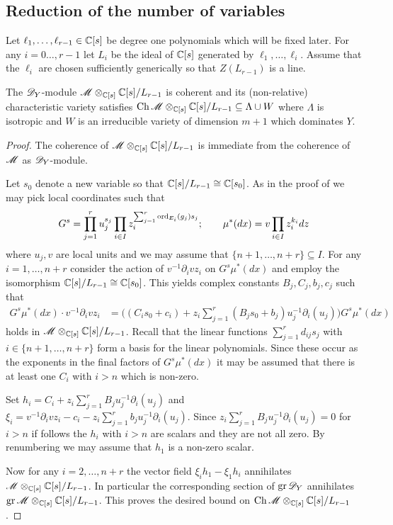   \subsection{Reduction of the number of variables}
  Let $\ell_1,\ldots,\ell_{r-1}\in \mathbb{C}[s]$ be degree one polynomials which will be fixed later.
  For any $i=0\ldots,r-1$ let $L_i$ be the ideal of $\mathbb{C}[s]$ generated by $\ell_1,\ldots,\ell_i$.
  Assume that the $\ell_i$ are chosen sufficiently generically so that $Z(L_{r-1})$ is a line.
  \begin{proposition}\label{prop: CharVarEstimateW}
    The $\mathscr{D}_Y$-module $\mathscr{M}\otimes_{\mathbb{C}[s]}\mathbb{C}[s]/L_{r-1}$ is coherent and its (non-relative) characteristic variety satisfies $\operatorname{Ch}\mathscr{M}\otimes_{\mathbb{C}[s]}\mathbb{C}[s]/L_{r-1} \subseteq \Lambda \cup W $ where $\Lambda$ is isotropic and $W$ is an irreducible variety of dimension $m +1$ which dominates $Y$.
\end{proposition}
\begin{proof}
  The coherence of $\mathscr{M}\otimes_{\mathbb{C}[s]}\mathbb{C}[s]/L_{r-1}$ is immediate from the coherence of $\mathscr{M}$ as $\mathscr{D}_Y$-module.

  Let $s_0$ denote a new variable so that $\mathbb{C}[s]/L_{r-1}\cong \mathbb{C}[s_0]$. As in the proof of  we may pick local coordinates such that
  $$G^s = \prod_{j=1}^r u_j^{s_j} \prod_{i\in I} z_i^{\sum_{j=1}^r   \operatorname{ord}_{E_i}(g_j)s_j};\qquad \mu^*(dx) = v \prod_{i\in I} z_i^{k_i} dz$$
  where $u_j, v$ are local units and we may assume that $\{n+1,\ldots,n+r\}\subseteq I$.
  For any $i=1,\ldots,n+r$ consider the action of $v^{-1}\partial_i v z_i$ on $G^s \mu^*(dx)$ and employ the isomorphism $\mathbb{C}[s]/L_{r-1}\cong \mathbb{C}[s_0]$.
  This yields complex constants $B_j,C_j,b_j,c_j$ such that
  \begin{align*}
    G^s \mu^*(dx) \cdot v^{-1}\partial_i vz_i &=\bigl((C_i s_0 + c_i) + z_i\sum_{j=1}^{r} (B_j s_0 +b_j) u_j^{-1}\partial_i(u_j) \bigr) G^s \mu^*(dx)
  \end{align*}
  holds in $\mathscr{M}\otimes_{\mathbb{C}[s]}\mathbb{C}[s]/L_{r-1}$.
  Recall that the linear functions $\sum_{j=1}^r d_{ij}s_j$ with $i \in \{n+1,\ldots,n+r\}$ form a basis for the linear polynomials.
  Since these occur as the exponents in the final factors of  $G^s\mu^*(dx)$ it may be assumed that there is at least one $C_{i}$ with $i>n$ which is non-zero.

  Set $h_i = C_i + z_i\sum_{j=1}^r B_ju_j^{-1}\partial_i(u_j)$ and $\xi_i= v^{-1}\partial_i vz_i - c_i - z_i\sum_{j=1}^{r} b_j u_j^{-1}\partial_i(u_j)$. Since $ z_i\sum_{j=1}^r B_ju_j^{-1}\partial_i(u_j) = 0$ for $i>n$ if follows the $h_{i}$ with $i>n$ are scalars and they are not all zero.
  By renumbering we may assume that $h_1$ is a non-zero scalar.

  Now for any $i=2,\ldots,n+r$ the vector field $\xi_i h_1 - \xi_1 h_i$ annihilates $\mathscr{M}\otimes_{\mathbb{C}[s]}\mathbb{C}[s]/L_{r-1}$.
  In particular the corresponding section of $\operatorname{gr} \mathscr{D}_Y$ annihilates $\operatorname{gr}\mathscr{M}\otimes_{\mathbb{C}[s]}\mathbb{C}[s]/L_{r-1}$.
  This proves the desired bound on $\operatorname{Ch} \mathscr{M}\otimes_{\mathbb{C}[s]}\mathbb{C}[s]/L_{r-1}$.
\end{proof}
